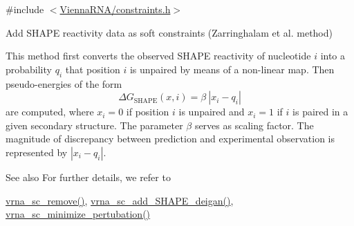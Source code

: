 {\ttfamily \#include $<$\hyperlink{constraints_8h}{Vienna\+R\+N\+A/constraints.\+h}$>$}



Add S\+H\+A\+P\+E reactivity data as soft constraints (Zarringhalam et al. method) 

This method first converts the observed S\+H\+A\+P\+E reactivity of nucleotide $ i $ into a probability $ q_i $ that position $ i $ is unpaired by means of a non-\/linear map. Then pseudo-\/energies of the form \[ \Delta G_{\text{SHAPE}}(x,i) = \beta\ |x_i - q_i| \] are computed, where $ x_i=0 $ if position $ i $ is unpaired and $ x_i=1 $ if $ i $ is paired in a given secondary structure. The parameter $ \beta $ serves as scaling factor. The magnitude of discrepancy between prediction and experimental observation is represented by $ |x_i - q_i| $.

\begin{DoxySeeAlso}{See also}
For further details, we refer to \cite{zarringhalam:2012} 

\hyperlink{group__soft__constraints_ga73cdc07b9a199c614367bebef0f2c41a}{vrna\+\_\+sc\+\_\+remove()}, \hyperlink{group__soft__constraints_ga57d612b58e1c61dd6cfcb5a843f8f1b3}{vrna\+\_\+sc\+\_\+add\+\_\+\+S\+H\+A\+P\+E\+\_\+deigan()}, \hyperlink{group__soft__constraints_gaa124bdc20d88001c38ade590c4bcc3c4}{vrna\+\_\+sc\+\_\+minimize\+\_\+pertubation()}
\end{DoxySeeAlso}


